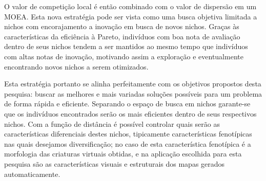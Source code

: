 O valor de competição local é então combinado com o valor de dispersão em um MOEA. Esta nova estratégia pode ser vista como uma busca objetiva limitada a nichos com encorajamento a inovação em busca de novos nichos. Graças às características da eficiência à Pareto, indivíduos com boa nota de avaliação dentro de seus nichos tendem a ser mantidos ao mesmo tempo que indivíduos com altas notas de inovação, motivando assim a exploração e eventualmente encontrando novos nichos a serem otimizados.

Esta estratégia portanto se alinha perfeitamente com os objetivos propostos desta pesquisa: buscar as melhores e mais variadas soluções possíveis para um problema de forma rápida e eficiente. Separando o espaço de busca em nichos garante-se que os indivíduos encontrados serão os mais eficientes dentro de seus respectivos nichos. Com a função de distância é possível controlar quais serão as características diferenciais destes nichos, tipicamente características fenotípicas nas quais desejamos diversificação; no caso de \cite{lehman2011evolving} esta característica fenotípica é a morfologia das criaturas virtuais obtidas, e na aplicação escolhida para esta pesquisa são as características visuais e estruturais dos mapas gerados automaticamente.